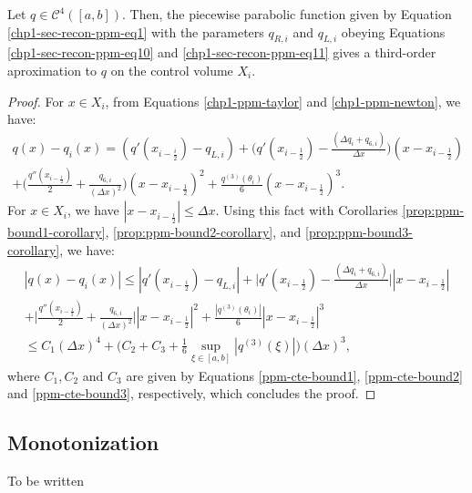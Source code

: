 \begin{prop}
	\label{prop:ppm-bound4}
	Let $q \in \mathcal{C}^{4}([a,b])$.
	Then, the piecewise parabolic function given by
	Equation \eqref{chp1-sec-recon-ppm-eq1} with 
	the parameters $q_{R,i}$ and $q_{L,i}$ obeying Equations
	\eqref{chp1-sec-recon-ppm-eq10} and \eqref{chp1-sec-recon-ppm-eq11}
	gives a third-order aproximation to $q$ on the control volume $X_i$.
\end{prop}
\begin{proof}
For $x \in X_i$, from Equations \eqref{chp1-ppm-taylor} and \eqref{chp1-ppm-newton}, we have:
\begin{equation*}
	\begin{split}
	q(x)-q_i(x) = (q'(x_{i-\frac{i}{2}})-q_{L,i})	
	+ \bigg(q'(x_{i-\frac{1}{2}})-  \frac{(\Delta q_i + q_{6, i})}{\Delta x}\bigg)(x-x_{i-\frac{1}{2}})
	\\+ \bigg(\frac{q''(x_{i-\frac{1}{2}})}{2} + \frac{q_{6, i}}{(\Delta x)^2}\bigg)(x-x_{i-\frac{1}{2}})^2
	+ \frac{q^{(3)}(\theta_i)}{6}(x-x_{i-\frac{1}{2}})^3.
	\end{split}
\end{equation*}
For $x\in X_i$, we have $|x -x_{i-\frac{i}{2}}| \leq \Delta x$. 
Using this fact with Corollaries \ref{prop:ppm-bound1-corollary}, \ref{prop:ppm-bound2-corollary},
and  \ref{prop:ppm-bound3-corollary}, we have:
\begin{equation*}
	\begin{split}
	|q(x)-q_i(x)| \leq |q'(x_{i-\frac{i}{2}})-q_{L,i}|
	+ \bigg|q'(x_{i-\frac{1}{2}})-  \frac{(\Delta q_i + q_{6, i})}{\Delta x}\bigg||x-x_{i-\frac{1}{2}}|
	\\+ \bigg|\frac{q''(x_{i-\frac{1}{2}})}{2} + \frac{q_{6, i}}{(\Delta x)^2}\bigg||x-x_{i-\frac{1}{2}}|^2
	+ \frac{|q^{(3)}(\theta_i)|}{6}|x-x_{i-\frac{1}{2}}|^3 \\
	\leq C_1(\Delta x)^4 + \bigg(C_2+C_3+\frac{1}{6}
	\sup_{\xi \in [a,b]}{|q^{(3)}(\xi)|} \bigg)(\Delta x)^3,
	\end{split}
\end{equation*}
where $C_1, C_2$ and $C_3$ are given by Equations \eqref{ppm-cte-bound1},
\eqref{ppm-cte-bound2} and \eqref{ppm-cte-bound3}, respectively, which
concludes the proof.
\renewcommand\qedsymbol{} %
\end{proof}
%

\subsection{Monotonization}
To be written
\label{chp1-sec-mono}


